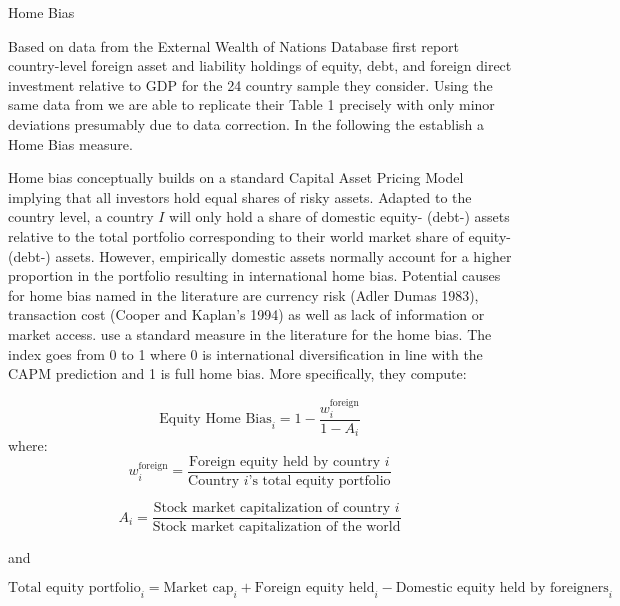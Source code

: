 \documentclass{article}
\begin{document}




 

Home Bias

Based on data from the External Wealth of Nations Database \textcite{main} first report country-level foreign asset and liability holdings of equity, debt, and foreign direct investment relative to GDP for the 24 country sample they consider. Using the same data from  we are able to replicate their Table 1 precisely with only minor deviations presumably due to data correction. In the following the establish a Home Bias measure.


Home bias conceptually builds on a standard Capital Asset Pricing Model implying that all investors hold equal shares of risky assets. Adapted to the country level, a country $I$ will only hold a share of domestic equity- (debt-) assets relative to the total portfolio corresponding to their world market share of equity- (debt-) assets. However, empirically domestic assets normally account for a higher proportion in the portfolio resulting in international home bias. Potential causes for home bias named in the literature are currency risk (Adler Dumas 1983), transaction cost (Cooper and Kaplan’s 1994) as well as lack of information or market access.
\textcite{main} use a standard measure in the literature for the home bias. The index goes from 0 to 1 where 0 is international diversification in line with the CAPM prediction and 1 is full home bias. More specifically, they compute:

\begin{equation}
      \text{Equity Home Bias}_i = 1 - \frac{w_i^{\text{foreign}}}{1 - A_i}
    \end{equation}
    where:
    \begin{equation*}
      w_i^{\text{foreign}} = \frac{\text{Foreign equity held by country } i}{\text{Country } i\text{'s total equity portfolio}}
    \end{equation*}

    \begin{equation*}
      A_i = \frac{\text{Stock market capitalization of country } i}{\text{Stock market capitalization of the world}}
    \end{equation*}

    and

    \begin{equation*}
      \text{Total equity portfolio}_i = \text{Market cap}_i + \text{Foreign equity held}_i - \text{Domestic equity held by foreigners}_i
\end{equation*}
\end{document}
